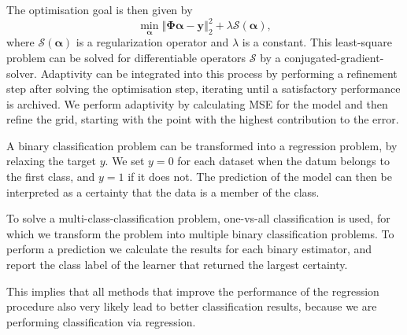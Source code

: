 The optimisation goal is then given by
\begin{equation}\label{eq:optGoal}
\min_{\bm{\alpha}} \left\Vert  \bm{\Phi} \bm{\alpha} - \bm{y}   \right\Vert_2^2  + \lambda \mathcal{S}(\bm{\alpha}), 
\end{equation}
where \(\mathcal{S}(\bm{\alpha})\) is a regularization operator and \(\lambda\) is a constant.
This least-square problem can be solved for differentiable operators
\(\mathcal{S}\) by a conjugated-gradient-solver.
Adaptivity can be integrated into this process by performing a refinement step
after solving the optimisation step, iterating until a satisfactory performance
is archived.
We perform adaptivity by calculating \textsc{MSE} for the model and then refine
the grid, starting with the point with the highest contribution to the error.

A binary classification problem can be transformed into a regression problem,
by relaxing the target \(y\).
We set \(y = 0\) for each dataset when the datum belongs to the first class, and
\(y = 1\) if it does not.
The prediction of the model can then be interpreted as a certainty that the
data is a member of the class.

To solve a multi-class-classification problem, one-vs-all classification is used,
for which we transform the problem into multiple binary classification problems.
To perform a prediction we calculate the results for each binary estimator, and
report the class label of the learner that returned the largest certainty.

This implies that all methods that improve the performance of the regression procedure also very likely lead to better classification results, because we are performing classification via regression.
